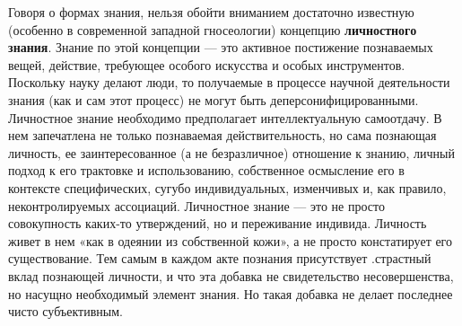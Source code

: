 \documentclass[12pt]{article}
\begin{document}
Говоря о формах знания, нельзя обойти вниманием достаточно известную (особенно в современной западной
гносеологии)  концепцию  \textbf{личностного  знания}.  Знание  по  этой  концепции --- это  активное  постижение
познаваемых вещей, действие, требующее особого искусства и особых инструментов. Поскольку науку делают
люди,  то  получаемые  в  процессе  научной  деятельности  знания  (как  и  сам  этот  процесс)  не  могут  быть
деперсонифицированными. Личностное знание необходимо предполагает интеллектуальную самоотдачу. В нем
запечатлена не только познаваемая действительность, но сама познающая личность, ее заинтересованное (а не
безразличное) отношение к знанию, личный подход к его трактовке и использованию, собственное осмысление
его  в  контексте  специфических,  сугубо  индивидуальных,  изменчивых  и,  как  правило,  неконтролируемых
ассоциаций.
Личностное знание --- это не просто совокупность каких-то утверждений, но и переживание индивида. Личность
живет в нем «как в одеянии из собственной кожи», а не просто констатирует его существование. Тем самым в
каждом акте познания присутствует .страстный вклад познающей личности, и что эта добавка не свидетельство
несовершенства,  но  насущно  необходимый  элемент  знания.  Но  такая  добавка  не  делает  последнее  чисто
субъективным.
\end{document}
